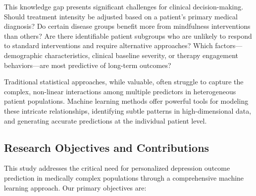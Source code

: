 \documentclass[conference]{IEEEtran}
\begin{document}
This knowledge gap presents significant challenges for clinical decision-making. Should treatment intensity be adjusted based on a patient's primary medical diagnosis? Do certain disease groups benefit more from mindfulness interventions than others? Are there identifiable patient subgroups who are unlikely to respond to standard interventions and require alternative approaches? Which factors—demographic characteristics, clinical baseline severity, or therapy engagement behaviors—are most predictive of long-term outcomes?

Traditional statistical approaches, while valuable, often struggle to capture the complex, non-linear interactions among multiple predictors in heterogeneous patient populations. Machine learning methods offer powerful tools for modeling these intricate relationships, identifying subtle patterns in high-dimensional data, and generating accurate predictions at the individual patient level.

\subsection{Research Objectives and Contributions}

This study addresses the critical need for personalized depression outcome prediction in medically complex populations through a comprehensive machine learning approach. Our primary objectives are:
\end{document}
